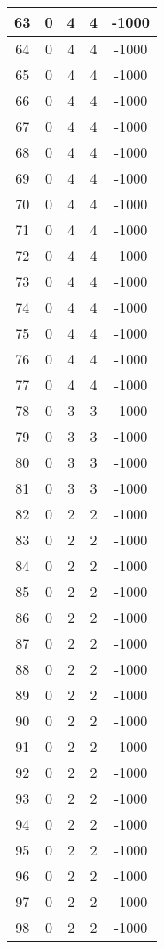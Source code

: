 \documentclass[letterpaper, 12pt]{article}
\begin{document}
\begin{longtable}{|c|c|c|c|c|}
\hline
63 & 0 & 4 & 4 & -1000 \\
\hline
64 & 0 & 4 & 4 & -1000 \\
\hline
65 & 0 & 4 & 4 & -1000 \\
\hline
66 & 0 & 4 & 4 & -1000 \\
\hline
67 & 0 & 4 & 4 & -1000 \\
\hline
68 & 0 & 4 & 4 & -1000 \\
\hline
69 & 0 & 4 & 4 & -1000 \\
\hline
70 & 0 & 4 & 4 & -1000 \\
\hline
71 & 0 & 4 & 4 & -1000 \\
\hline
72 & 0 & 4 & 4 & -1000 \\
\hline
73 & 0 & 4 & 4 & -1000 \\
\hline
74 & 0 & 4 & 4 & -1000 \\
\hline
75 & 0 & 4 & 4 & -1000 \\
\hline
76 & 0 & 4 & 4 & -1000 \\
\hline
77 & 0 & 4 & 4 & -1000 \\
\hline
78 & 0 & 3 & 3 & -1000 \\
\hline
79 & 0 & 3 & 3 & -1000 \\
\hline
80 & 0 & 3 & 3 & -1000 \\
\hline
81 & 0 & 3 & 3 & -1000 \\
\hline
82 & 0 & 2 & 2 & -1000 \\
\hline
83 & 0 & 2 & 2 & -1000 \\
\hline
84 & 0 & 2 & 2 & -1000 \\
\hline
85 & 0 & 2 & 2 & -1000 \\
\hline
86 & 0 & 2 & 2 & -1000 \\
\hline
87 & 0 & 2 & 2 & -1000 \\
\hline
88 & 0 & 2 & 2 & -1000 \\
\hline
89 & 0 & 2 & 2 & -1000 \\
\hline
90 & 0 & 2 & 2 & -1000 \\
\hline
91 & 0 & 2 & 2 & -1000 \\
\hline
92 & 0 & 2 & 2 & -1000 \\
\hline
93 & 0 & 2 & 2 & -1000 \\
\hline
94 & 0 & 2 & 2 & -1000 \\
\hline
95 & 0 & 2 & 2 & -1000 \\
\hline
96 & 0 & 2 & 2 & -1000 \\
\hline
97 & 0 & 2 & 2 & -1000 \\
\hline
98 & 0 & 2 & 2 & -1000 \\

\end{longtable}
\end{document}
